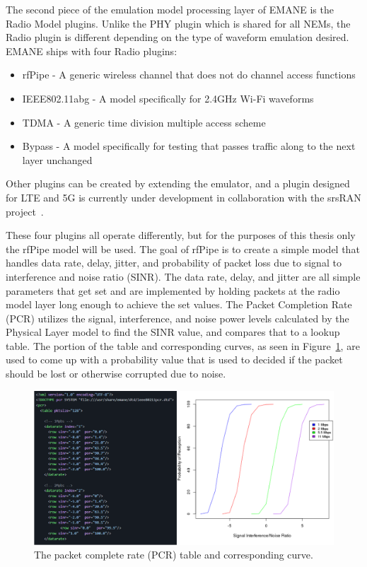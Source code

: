 The second piece of the emulation model processing layer of EMANE is the Radio Model plugins.
Unlike the PHY plugin which is shared for all NEMs, the Radio plugin is different depending on the type of waveform emulation desired.
EMANE ships with four Radio plugins:
\begin{itemize}
    \item rfPipe - A generic wireless channel that does not do channel access functions
    \item IEEE802.11abg - A model specifically for 2.4GHz Wi-Fi waveforms
    \item TDMA - A generic time division multiple access scheme
    \item Bypass - A model specifically for testing that passes traffic along to the next layer unchanged
\end{itemize}
Other plugins can be created by extending the emulator, and a plugin designed for LTE and 5G is currently under development in collaboration with the srsRAN project~\cite{srsran,srsran-emane}.\par
These four plugins all operate differently, but for the purposes of this thesis only the rfPipe model will be used.
The goal of rfPipe is to create a simple model that handles data rate, delay, jitter, and probability of packet loss due to signal to interference and noise ratio (SINR).
The data rate, delay, and jitter are all simple parameters that get set and are implemented by holding packets at the radio model layer long enough to achieve the set values.
The Packet Completion Rate (PCR) utilizes the signal, interference, and noise power levels calculated by the Physical Layer model to find the SINR value, and compares that to a lookup table.
The portion of the table and corresponding curves, as seen in Figure~\ref{emane_pcr}, are used to come up with a probability value that is used to decided if the packet should be lost or otherwise corrupted due to noise.

\begin{figure}[!ht]
    \centering
    \includegraphics[width=\textwidth,keepaspectratio]{Images/Chpt2/emane_pcr.png}
    \caption{The packet complete rate (PCR) table and corresponding curve.}
    \label{emane_pcr}
\end{figure}

